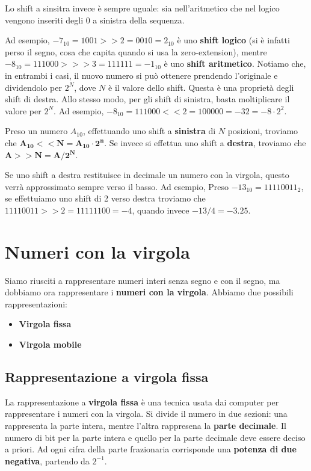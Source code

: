 \documentclass[11pt, a4paper, titlepage, oneside]{scrbook}
\begin{document}
Lo shift a sinsitra invece è sempre uguale: sia nell'aritmetico che nel logico vengono inseriti degli 0 a sinistra della sequenza.

Ad esempio, $-7_{10} = 1001 \bm{>>} 2 = 0010 = 2_{10}$ è uno \textbf{shift logico} (si è infatti perso il segno, cosa che capita quando si usa la zero-extension), mentre $-8_{10} = 111000 \bm{>>>} 3 = 111111 = -1_{10}$ è uno \textbf{shift aritmetico}. Notiamo che, in entrambi i casi, il nuovo numero si può ottenere prendendo l'originale e dividendolo per $2^N$, dove $N$ è il valore dello shift. Questa è una proprietà degli shift di destra. Allo stesso modo, per gli shift di sinistra, basta moltiplicare il valore per $2^N$. Ad esempio, $-8_{10} = 111000 << 2 = 100000 = -32 = -8 \cdot 2^2$.  

\begin{Proposizione}
\label{propos-caloclare-decimale-post-shift}
Preso un numero $A_{10}$, effettuando uno shift a \textbf{sinistra} di $N$ posizioni, troviamo che $\bm{A_{10} << N = A_{10} \cdot 2^n}$. Se invece si effettua uno shift a \textbf{destra}, troviamo che $\bm{A >> N = A / 2^N}$.  
\end{Proposizione}

Se uno shift a destra restituisce in decimale un numero con la virgola, questo verrà approssimato sempre verso il basso. Ad esempio, Preso $-13_{10} = 11110011_2$, se effettuiamo uno shift di 2 verso destra troviamo che $11110011 >> 2 = 11111100 = -4$, quando invece $-13/4 = -3.25$.


\section{Numeri con la virgola}

Siamo riusciti a rappresentare numeri interi senza segno e con il segno, ma dobbiamo ora rappresentare i \textbf{numeri con la virgola}. Abbiamo due possibili rappresentazioni: 
\begin{itemize}
    \item \textbf{Virgola fissa}
    \item \textbf{Virgola mobile}
\end{itemize}

\subsection{Rappresentazione a virgola fissa}

\begin{Proprieta}
\label{prop-rappr-virgola-fissa}
La rappresentazione a \textbf{virgola fissa} è una tecnica usata dai computer per rappresentare i numeri con la virgola. Si divide il numero in due sezioni: una rappresenta la parte intera, mentre l'altra rappresena la \textbf{parte decimale}. Il numero di bit per la parte intera e quello per la parte decimale deve essere deciso a priori. Ad ogni cifra della parte frazionaria corrisponde una \textbf{potenza di due negativa}, partendo da $2^{-1}$.
\end{Proprieta}
\end{document}
